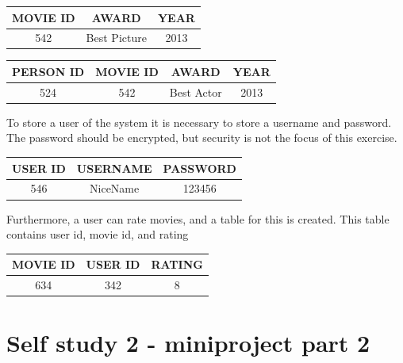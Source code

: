 \documentclass[10pt,a4paper,final]{report}
\begin{document}
\begin{table}[H] \centering
\begin{tabular}{|c|c|c|}
\hline 
MOVIE ID & AWARD & YEAR \\ 
\hline 
542 & Best Picture & 2013 \\ 
\hline 
\end{tabular} 
\end{table}

\begin{table}[H] \centering
\begin{tabular}{|c|c|c|c|}
\hline 
PERSON ID & MOVIE ID & AWARD & YEAR\\ 
\hline 
524 & 542 & Best Actor & 2013 \\ 
\hline 
\end{tabular} 
\end{table}

To store a user of the system it is necessary to store a username and password. The password should be encrypted, but security is not the focus of this exercise.

\begin{table}[H] \centering
\begin{tabular}{|c|c|c|}
\hline 
USER ID & USERNAME & PASSWORD \\ 
\hline 
546 & NiceName & 123456 \\ 
\hline 
\end{tabular} 
\end{table}

Furthermore, a user can rate movies, and a table for this is created. This table contains user id, movie id, and rating

\begin{table}[H] \centering
\begin{tabular}{|c|c|c|}
\hline 
MOVIE ID & USER ID & RATING \\ 
\hline 
634 & 342 & 8 \\ 
\hline 
\end{tabular} 
\end{table}
\newpage
\section*{Self study 2 - miniproject part 2}
\end{document}
